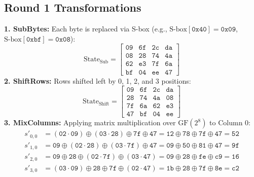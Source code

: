 \subsection{Round 1 Transformations}
\textbf{1. SubBytes:} Each byte is replaced via S-box (e.g., $\text{S-box}[\texttt{0x40}] = \texttt{0x09}$, $\text{S-box}[\texttt{0xbf}] = \texttt{0x08}$):
\begin{equation}
\text{State}_{\text{Sub}} = \begin{bmatrix}
\texttt{09} & \texttt{6f} & \texttt{2c} & \texttt{da} \\
\texttt{08} & \texttt{28} & \texttt{74} & \texttt{4a} \\
\texttt{62} & \texttt{e3} & \texttt{7f} & \texttt{6a} \\
\texttt{bf} & \texttt{04} & \texttt{ee} & \texttt{47}
\end{bmatrix}
\end{equation}
\textbf{2. ShiftRows:} Rows shifted left by 0, 1, 2, and 3 positions:
\begin{equation}
\text{State}_{\text{Shift}} = \begin{bmatrix}
\texttt{09} & \texttt{6f} & \texttt{2c} & \texttt{da} \\
\texttt{28} & \texttt{74} & \texttt{4a} & \texttt{08} \\
\texttt{7f} & \texttt{6a} & \texttt{62} & \texttt{e3} \\
\texttt{47} & \texttt{bf} & \texttt{04} & \texttt{ee}
\end{bmatrix}
\end{equation}
\textbf{3. MixColumns:} Applying matrix multiplication over $\text{GF}(2^8)$ to Column 0:
\begin{align*}
s'_{0,0} &= (\texttt{02} \cdot \texttt{09}) \oplus (\texttt{03} \cdot \texttt{28}) \oplus \texttt{7f} \oplus \texttt{47} = \texttt{12} \oplus \texttt{78} \oplus \texttt{7f} \oplus \texttt{47} = \texttt{52} \\
s'_{1,0} &= \texttt{09} \oplus (\texttt{02} \cdot \texttt{28}) \oplus (\texttt{03} \cdot \texttt{7f}) \oplus \texttt{47} = \texttt{09} \oplus \texttt{50} \oplus \texttt{81} \oplus \texttt{47} = \texttt{9f} \\
s'_{2,0} &= \texttt{09} \oplus \texttt{28} \oplus (\texttt{02} \cdot \texttt{7f}) \oplus (\texttt{03} \cdot \texttt{47}) = \texttt{09} \oplus \texttt{28} \oplus \texttt{fe} \oplus \texttt{c9} = \texttt{16} \\
s'_{3,0} &= (\texttt{03} \cdot \texttt{09}) \oplus \texttt{28} \oplus \texttt{7f} \oplus (\texttt{02} \cdot \texttt{47}) = \texttt{1b} \oplus \texttt{28} \oplus \texttt{7f} \oplus \texttt{8e} = \texttt{c2}
\end{align*}
